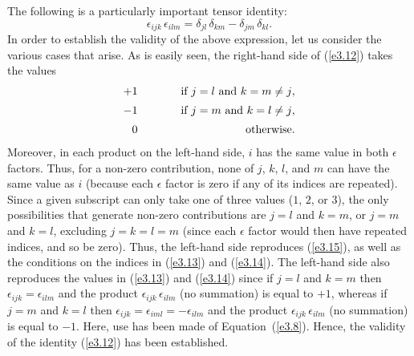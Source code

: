 The following is a particularly important tensor identity:
\begin{equation}\label{e3.12}
\epsilon_{ijk}\,\epsilon_{ilm} = \delta_{jl}\,\delta_{km}-\delta_{jm}\,\delta_{kl}.
\end{equation}
In order to establish the validity of the above expression, let us consider the various cases that arise. 
As is easily seen, the right-hand side of (\ref{e3.12}) takes the values
\begin{eqnarray}
+1&\mbox{\hspace{1cm}}&\mbox{if $j=l$ and $k=m\neq j$},\label{e3.13}\\[0.5ex]
-1&&\mbox{if $j=m$ and $k=l\neq j$},\label{e3.14}\\[0.5ex]
0&&\mbox{otherwise}.\label{e3.15}
\end{eqnarray}
Moreover, in each product on the left-hand side, $i$ has the same value in both $\epsilon$  factors. Thus,
for a non-zero contribution,
none of $j$, $k$, $l$, and $m$ can have the same value as $i$ (because each $\epsilon$ factor is zero if any of its
indices are repeated). Since a given subscript
can only take one of three values ($1$, $2$, or $3$), the only possibilities that
generate non-zero contributions are $j=l$ and $k=m$, or $j=m$ and $k=l$, excluding $j=k=l=m$ (since 
each $\epsilon$ factor would then have repeated indices, and so be zero). Thus, the left-hand side reproduces (\ref{e3.15}), as well as the conditions on the indices  in
(\ref{e3.13}) and (\ref{e3.14}). The left-hand side also reproduces the values in (\ref{e3.13}) and (\ref{e3.14}) since if $j=l$ and $k=m$ then $\epsilon_{ijk}=\epsilon_{ilm}$
and the product $\epsilon_{ijk}\,\epsilon_{ilm}$ (no summation) is equal to $+1$, whereas
if $j=m$ and $k=l$ then $\epsilon_{ijk}=\epsilon_{iml}=-\epsilon_{ilm}$ and the
 product $\epsilon_{ijk}\,\epsilon_{ilm}$ (no summation) is equal to $-1$. Here, use has been made of Equation~(\ref{e3.8}).
Hence, the validity of the identity (\ref{e3.12}) has been established. 

